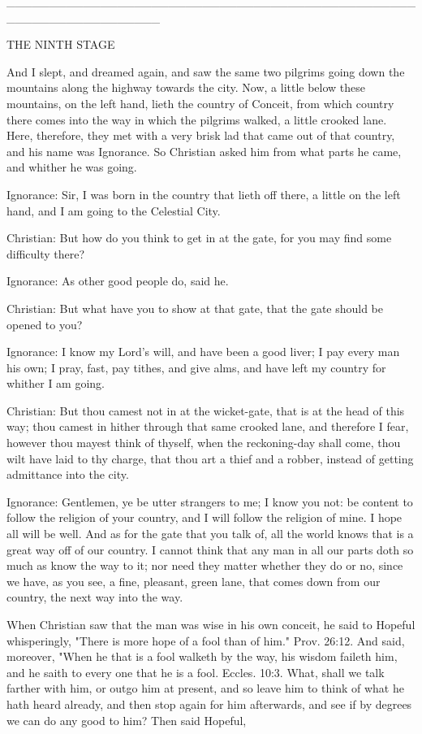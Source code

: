 __________________________________________________________________

THE NINTH STAGE

And I slept, and dreamed again, and saw the same two pilgrims going
down the mountains along the highway towards the city. Now, a little
below these mountains, on the left hand, lieth the country of Conceit,
from which country there comes into the way in which the pilgrims
walked, a little crooked lane. Here, therefore, they met with a very
brisk lad that came out of that country, and his name was Ignorance. So
Christian asked him from what parts he came, and whither he was going.

Ignorance: Sir, I was born in the country that lieth off there, a
little on the left hand, and I am going to the Celestial City.

Christian: But how do you think to get in at the gate, for you may find
some difficulty there?

Ignorance: As other good people do, said he.

Christian: But what have you to show at that gate, that the gate should
be opened to you?

Ignorance: I know my Lord's will, and have been a good liver; I pay
every man his own; I pray, fast, pay tithes, and give alms, and have
left my country for whither I am going.

Christian: But thou camest not in at the wicket-gate, that is at the
head of this way; thou camest in hither through that same crooked lane,
and therefore I fear, however thou mayest think of thyself, when the
reckoning-day shall come, thou wilt have laid to thy charge, that thou
art a thief and a robber, instead of getting admittance into the city.

Ignorance: Gentlemen, ye be utter strangers to me; I know you not: be
content to follow the religion of your country, and I will follow the
religion of mine. I hope all will be well. And as for the gate that you
talk of, all the world knows that is a great way off of our country. I
cannot think that any man in all our parts doth so much as know the way
to it; nor need they matter whether they do or no, since we have, as
you see, a fine, pleasant, green lane, that comes down from our
country, the next way into the way.

When Christian saw that the man was wise in his own conceit, he said to
Hopeful whisperingly, "There is more hope of a fool than of him." Prov.
26:12. And said, moreover, "When he that is a fool walketh by the way,
his wisdom faileth him, and he saith to every one that he is a fool.
Eccles. 10:3. What, shall we talk farther with him, or outgo him at
present, and so leave him to think of what he hath heard already, and
then stop again for him afterwards, and see if by degrees we can do any
good to him? Then said Hopeful,


